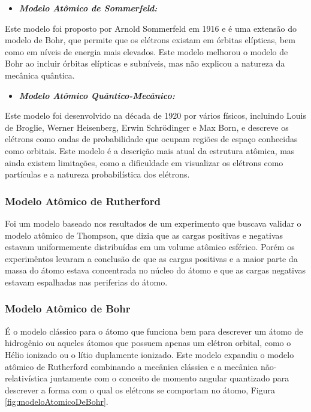 \documentclass[11pt,a4paper]{article}
\begin{document}
            \begin{itemize}
                \item \textbf{\textit{\textcolor{CarnationPink}{Modelo Atômico de Sommerfeld:}}}
            \end{itemize}

                Este modelo foi proposto por Arnold Sommerfeld em 1916 e é uma extensão do modelo de Bohr, que permite que os elétrons existam em órbitas elípticas, bem como em níveis de energia mais elevados. Este modelo melhorou o modelo de Bohr ao incluir órbitas elípticas e subníveis, mas não explicou a natureza da mecânica quântica.


            \begin{itemize}
                \item \textbf{\textit{\textcolor{CarnationPink}{Modelo Atômico Quântico-Mecânico:}}}
            \end{itemize}

                Este modelo foi desenvolvido na década de 1920 por vários físicos, incluindo Louis de Broglie, Werner Heisenberg, Erwin Schrödinger e Max Born, e descreve os elétrons como ondas de probabilidade que ocupam regiões de espaço conhecidas como orbitais. Este modelo é a descrição mais atual da estrutura atômica, mas ainda existem limitações, como a dificuldade em visualizar os elétrons como partículas e a natureza probabilística dos elétrons.
        
            \subsubsection{Modelo Atômico de Rutherford}

                Foi um modelo baseado nos resultados de um experimento que buscava validar o modelo atômico de Thompson, que dizia que as cargas positivas e negativas estavam uniformemente distribuídas em um volume atômico esférico. Porém os experimêntos levaram a conclusão de que as cargas positivas e a maior parte da massa do átomo estava concentrada no núcleo do átomo e que as cargas negativas estavam espalhadas nas periferias do átomo. 

            \subsubsection{Modelo Atômico de Bohr}

                É o modelo clássico para o átomo que funciona bem para descrever um átomo de hidrogênio ou aqueles átomos que possuem apenas um elétron orbital, como o Hélio ionizado ou o lítio duplamente ionizado. Este modelo expandiu o modelo atômico de Rutherford combinando a mecânica clássica e a mecânica não-relativística juntamente com o conceito de momento angular quantizado para descrever a forma com o qual os elétrons se comportam no átomo, Figura \ref{fig:modeloAtomicoDeBohr}.
\end{document}
